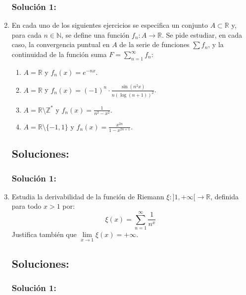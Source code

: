 \documentclass[a4paper, 11pt]{article} %
\begin{document}
\begin{enumerate}
		\subsubsection*{Solución 1:}
	
	\item En cada uno de los siguientes ejercicios se especifica un conjunto $A \subset \mathbb{R}$ y,
	para cada $n \in \mathbb{N}$, se define una función $f_n: A \rightarrow \mathbb{R}$. Se pide estudiar,
	en cada caso, la convergencia puntual en $A$ de la serie de funciones $\sum f_n$, y la continuidad
	de la función suma $\displaystyle{F = \sum^{\infty}_{n = 1} f_n}$:
	\begin{enumerate}
		\item $A = \mathbb{R}$ y $f_n(x) = e^{-nx}$.
		\item $A = \mathbb{R}$ y $f_n(x) = (-1)^n \cdot \displaystyle{\frac{\sin (n^2x)}{n(\log(n+1))^2}}$.
		\item $A = \mathbb{R} \setminus \mathbb{Z}^*$ y $f_n(x) = \displaystyle{\frac{1}{n^2-x^2}}$.
		\item $A = \mathbb{R} \setminus \{-1,1\}$ y $f_n(x) = \displaystyle{\frac{x^{2n}}{1-x^{2n+1}}}$.
	\end{enumerate}
	\subsection*{Soluciones:}
		\subsubsection*{Solución 1:}
	
	\item Estudia la derivabilidad de la función de Riemann $\xi: ]1, +\infty[ \rightarrow \mathbb{R}$, definida
	para todo $x > 1$ por:
	$$\displaystyle{\xi(x) = \sum^{\infty}_{n=1} \frac{1}{n^x}}$$
	Justifica también que $\lim\limits_{x \rightarrow 1} \xi(x) = +\infty$.
	\subsection*{Soluciones:}
		\subsubsection*{Solución 1:}
\end{enumerate}
\end{document}
